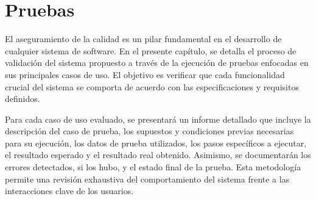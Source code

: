 \chapter{Pruebas}

El aseguramiento de la calidad es un pilar fundamental en el desarrollo de cualquier sistema de software. En el presente capítulo, se detalla el proceso de validación del sistema propuesto a través de la ejecución de pruebas enfocadas en sus principales casos de uso. El objetivo es verificar que cada funcionalidad crucial del sistema se comporta de acuerdo con las especificaciones y requisitos definidos. 

Para cada caso de uso evaluado, se presentará un informe detallado que incluye la descripción del caso de prueba, los supuestos y condiciones previas necesarias para su ejecución, los datos de prueba utilizados, los pasos específicos a ejecutar, el resultado esperado y el resultado real obtenido. Asimismo, se documentarán los errores detectados, si los hubo, y el estado final de la prueba. Esta metodología permite una revisión exhaustiva del comportamiento del sistema frente a las interacciones clave de los usuarios. 



%
















